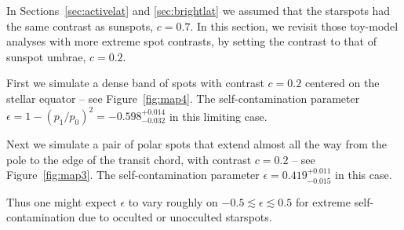 \begin{subappendices}
In Sections~\ref{sec:activelat} and \ref{sec:brightlat} we assumed that the starspots had the same contrast as sunspots, $c=0.7$. In this section, we revisit those toy-model analyses with more extreme spot contrasts, by setting the contrast to that of sunspot umbrae, $c=0.2$. 

First we simulate a dense band of spots with contrast $c=0.2$ centered on the stellar equator -- see Figure~\ref{fig:map4}. The self-contamination parameter $\epsilon = 1 - (p_1/p_0)^2 = -0.598_{-0.032}^{+0.014}$ in this limiting case. 

Next we simulate a pair of polar spots that extend almost all the way from the pole to the edge of the transit chord, with contrast $c=0.2$ -- see Figure~\ref{fig:map3}. The self-contamination parameter $\epsilon = 0.419_{-0.015}^{+0.011}$ in this case. 

Thus one might expect $\epsilon$ to vary roughly on $-0.5 \lesssim \epsilon \lesssim 0.5$ for extreme self-contamination due to occulted or unocculted starspots. 


\end{subappendices}
